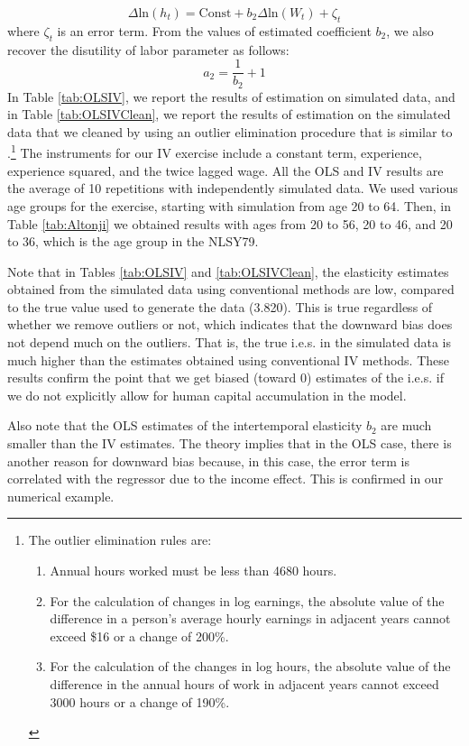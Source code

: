 \documentclass{article}
\begin{document}
$$ \Delta \text{ln}(h_t) = \text{Const} + b_2 \Delta \text{ln}(W_t) + \zeta_t$$
where $\zeta_t$ is an error term. From the values of estimated coefficient $b_2$, we also recover the disutility of labor parameter as follows:
$$ a_2 = \dfrac{1}{b_2} + 1 $$
In Table \ref{tab:OLSIV}, we report the results of estimation on simulated data, and in Table \ref{tab:OLSIVClean}, we report the results of estimation on the simulated data that we cleaned by using an outlier elimination procedure that is similar to \cite{MaCurdy1981-iy}.\footnote[12]{The outlier elimination rules are:
  \begin{enumerate}
      \item Annual hours worked must be less than 4680 hours.
      \item For the calculation of changes in log earnings, the absolute value of the difference in a person's average hourly earnings in adjacent years cannot exceed \$16 or a change of 200\%.
        \item For the calculation of the changes in log hours, the absolute value of the difference in the annual hours of work in adjacent years cannot exceed 3000 hours or a change of 190\%.
        \end{enumerate}} The instruments for our IV exercise include a constant term, experience, experience squared, and the twice lagged wage. All the OLS and IV results are the average of 10 repetitions with independently simulated data. We used various age groups for the exercise, starting with simulation from age 20 to 64. Then, in Table \ref{tab:Altonji} we obtained results with ages from 20 to 56, 20 to 46, and 20 to 36, which is the age group in the NLSY79. \par
      
      
      Note that in Tables \ref{tab:OLSIV} and \ref{tab:OLSIVClean}, the elasticity estimates obtained from the simulated data using conventional methods are low, compared to the true value used to generate the data (3.820). This is true regardless of whether we remove outliers or not, which indicates that the downward bias does not depend much on the outliers. That is, the true i.e.s. in the simulated data is much higher than the estimates obtained using conventional IV methods. These results confirm the point that we get biased (toward 0) estimates of the i.e.s. if we do not explicitly allow for human capital accumulation in the model. \par
      
      Also note that the OLS estimates of the intertemporal elasticity $b_2$ are much smaller than the IV estimates. The theory implies that in the OLS case, there is another reason for downward bias because, in this case, the error term is correlated with the regressor due to the income effect. This is confirmed in our numerical example. \par
\end{document}
